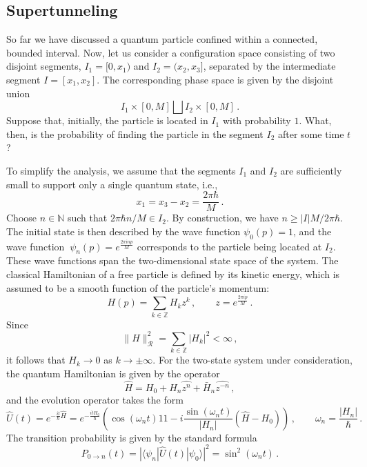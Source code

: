 \documentclass[12pt,a4paper]{article}
\numberwithin{equation}{section}
\theoremstyle{theorem}
\theoremstyle{remark}
\newcommand{\R}{\mathcal{R}}
\newcommand{\I}{1\!\! 1}
\begin{document}
\subsection{Supertunneling} 
So far we have discussed a quantum particle confined within a connected, bounded interval.  Now, let us consider a configuration space consisting of two disjoint segments, $I_1=[0, x_1)$ and $I_2=(x_2, x_3]$, separated by the intermediate segment $I=[x_1,x_2]$. The corresponding phase space is given by the disjoint union $$I_1\times [0,M]\bigsqcup I_2\times [0,M]\,.$$ Suppose that, initially, the particle is located in  $I_1$ with probability $1$. What, then, is the probability of finding the particle in the segment $I_2$ after some time $t$? 

To simplify the analysis, we assume that the segments $I_1$ and $I_2$ are sufficiently small to support only a single quantum state, i.e., 
$$
x_1=x_3-x_2=\frac{2\pi \hbar}{M}\,.
$$
Choose $n\in \mathbb{N}$ such that $2\pi \hbar n/M\in I_2$.  By construction, we have $n\geq|I|M/2\pi \hbar$. The initial state is then described by the wave function $\psi_0(p)=1$, and the wave function $~{\psi_{n}(p)=e^{\frac{2\pi i n p}{M}}}$ corresponds to the particle being located at $I_2$. These wave functions  span the two-dimensional state space of the system.  The classical Hamiltonian of a free particle is defined by its kinetic energy, which is assumed to be a smooth function of the particle's momentum:
\begin{equation}\label{HH}
     H(p)=\sum_{k\in \mathbb{Z}} H_k z^k\,, \qquad z=e^{\frac{2\pi i p}{M}}\,.
\end{equation}
Since 
\begin{equation}
\|H\|^2_\R=\sum_{k\in \mathbb{Z}}|H_k|^2<\infty\,,
\end{equation}
it follows that $H_k\to 0$ as $k\to \pm \infty$. For the two-state system under consideration, the quantum Hamiltonian is given by the operator
\begin{equation}\label{HHH}
    \hat H= H_0+H_n \widehat{z^n} +\bar H_n \widehat{z^{-n}}\,,
\end{equation}
and the evolution operator takes the form
\begin{equation}
    \hat U(t)=e^{-\frac{it}{\hbar}\hat H}=e^{-\frac{itH_0}{\hbar}}\left(\cos(\omega_n t) \I -i \frac{\sin(\omega_n t)}{|H_n|} (\hat H-H_0)\right)\,, \qquad \omega_n =\frac{|H_n|}{\hbar}\,.
    \end{equation}
The transition probability is given  by the standard formula
\begin{equation}
    P_{0\rightarrow n}(t)=|\langle \psi_n|\hat U(t) |\psi_0\rangle|^2=\sin^2(\omega_n t)\,.
\end{equation}
\end{document}
